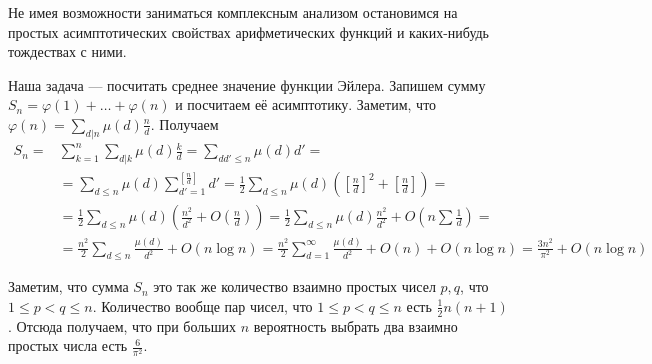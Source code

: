 \documentclass[10pt,a4paper,oneside]{book}
\theoremstyle{definition}
\def\ffi{\varphi}
\begin{document}
Не имея возможности заниматься комплексным анализом остановимся на простых асимптотических свойствах арифметических функций и каких-нибудь тождествах с ними.

Наша задача --- посчитать среднее значение функции Эйлера. Запишем сумму $S_n=\ffi(1)+\dots+\ffi(n)$ и посчитаем её асимптотику. Заметим, что $\ffi(n)=\sum_{d|n}\mu(d)\frac{n}{d}$. Получаем 
$$\begin{aligned}
S_n=&\sum_{k=1}^n\sum_{d|k}\mu(d)\frac{k}{d}=\sum_{dd'\leq n} \mu(d)d'=\\
&=\sum_{d\leq n}\mu(d)\sum_{d'=1}^{[\frac{n}{d}]} d'=\frac{1}{2}\sum_{d\leq n}\mu(d)\left(\left[\frac{n}{d}\right]^2+\left[\frac{n}{d}\right]\right)=\\
&=\frac{1}{2}\sum_{d\leq n}\mu(d)\left(\frac{n^2}{d^2}+O\left(\frac{n}{d}\right)\right)=\frac{1}{2}\sum_{d\leq n}\mu(d)\frac{n^2}{d^2}+O\left(n\sum \frac{1}{d}\right)=\\
&=\frac{n^2}{2}\sum_{d\leq n}\frac{\mu(d)}{d^2}+O\left(n\log n\right)=\frac{n^2}{2}\sum_{d=1}^{\infty}\frac{\mu(d)}{d^2}+O(n)+O(n\log n)= \frac{3n^2}{\pi^2}+O(n\log n)
\end{aligned}$$

Заметим, что сумма $S_n$ это так же количество взаимно простых чисел $p,q$, что $1\leq p<q\leq n$. Количество вообще пар чисел, что  $1\leq p<q\leq n$ есть $\frac{1}{2}n(n+1)$. Отсюда получаем, что при больших $n$ вероятность выбрать два взаимно простых числа есть $\frac{6}{\pi^2}$.
\end{document}
